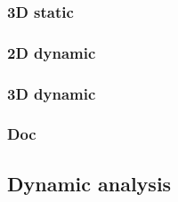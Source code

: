 \documentclass[12pt, a4paper]{article}
\begin{document}
\begin{scriptsize}
\begin{ttfamily}

\end{ttfamily}
\end{scriptsize}

\subsubsection{3D static}

\begin{scriptsize}
\begin{ttfamily}

\end{ttfamily}
\end{scriptsize}

\subsubsection{2D dynamic}

\begin{scriptsize}
\begin{ttfamily}

\end{ttfamily}
\end{scriptsize}

\subsubsection{3D dynamic}

\begin{scriptsize}
\begin{ttfamily}

\end{ttfamily}
\end{scriptsize}

\subsubsection{Doc}

\begin{scriptsize}
\begin{ttfamily}

\end{ttfamily}
\end{scriptsize}

\subsection{Dynamic analysis}
\end{document}
